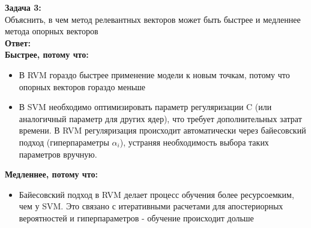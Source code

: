 \textbf{Задача 3:}\\
Объяснить, в чем метод релевантных векторов может быть быстрее и медленнее метода опорных векторов \\
\textbf{Ответ:} \\
\textbf{Быстрее, потому что:}
 \begin{itemize}
    \item В RVM гораздо быстрее применение модели к новым точкам, потому что опорных векторов гораздо меньше 
    \item В SVM необходимо оптимизировать параметр регуляризации C (или аналогичный параметр для других ядер), что требует дополнительных затрат времени. В RVM регуляризация происходит автоматически через байесовский подход (гиперпараметры $\alpha_i$), устраняя необходимость выбора таких параметров вручную.

\end{itemize}
\textbf{Медленнее, потому что:}
\begin{itemize}
    \item Байесовский подход в RVM делает процесс обучения более ресурсоемким, чем у SVM. Это связано с итеративными расчетами для апостериорных вероятностей и гиперпараметров - обучение происходит дольше
\end{itemize}

